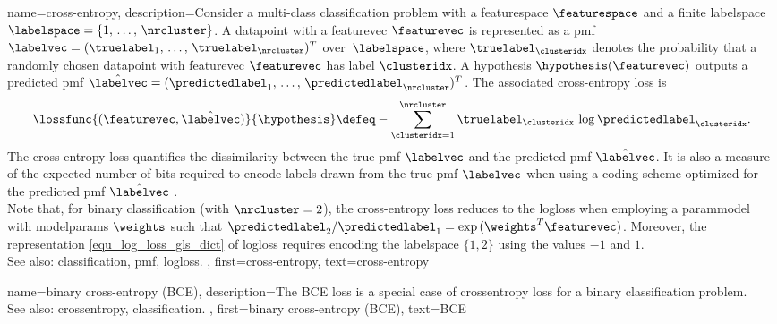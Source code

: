 {name={cross-entropy},
	description={Consider a multi-class \gls{classification} problem with a 
		\gls{featurespace} $\featurespace$ and a finite \gls{labelspace} 
              	$\labelspace = \{1,\,\ldots,\,\nrcluster\}$.  A \gls{datapoint} with a 
              	\gls{featurevec} $\featurevec$ is represented as a \gls{pmf} 
              	$\labelvec = (\truelabel_{1},\,\ldots,\,\truelabel_{\nrcluster})^{T}$ 
              	over~$\labelspace$, where $\truelabel_{\clusteridx}$ denotes the 
              	\gls{probability} that a randomly chosen \gls{datapoint} with 
		\gls{featurevec} $\featurevec$ has \gls{label} $\clusteridx$.  
		A \gls{hypothesis} $\hypothesis(\featurevec)$ outputs a predicted 
              	\gls{pmf} $\hat{\labelvec} = (\predictedlabel_{1},\,\ldots,
              	\,\predictedlabel_{\nrcluster})^{T}$. The associated 
              	cross-\gls{entropy} \gls{loss} is \cite{coverthomas} 
             	\begin{equation}
                		\nonumber
                		\lossfunc{(\featurevec,\hat{\labelvec})}{\hypothesis}
                		\defeq - \sum_{\clusteridx=1}^{\nrcluster} 
                		\truelabel_{\clusteridx}\,\log \predictedlabel_{\clusteridx}.
              	\end{equation}
		The cross-\gls{entropy} \gls{loss} quantifies the dissimilarity between the true 
		\gls{pmf} $\labelvec$ and the predicted \gls{pmf} $\hat{\labelvec}$. It is 
		also a \gls{measure} of the expected number of bits required to encode \glspl{label} 
		drawn from the true \gls{pmf} $\labelvec$ when using a coding scheme optimized for 
		the predicted \gls{pmf} $\hat{\labelvec}$ \cite{coverthomas}. \\
		Note that, for binary \gls{classification} (with $\nrcluster = 2$), the 
              	cross-\gls{entropy} \gls{loss} reduces to the \gls{logloss} when 
              	employing a \gls{parammodel} with \glspl{modelparam} $\weights$ 
              	such that $\predictedlabel_{2}/\predictedlabel_{1}
              	= \exp\,(\weights^{T}\featurevec)$. Moreover, the representation 
              	\eqref{equ_log_loss_gls_dict} of \gls{logloss} requires encoding 
              	the \gls{labelspace} $\{1,2\}$ using the values $-1$ and $1$. 
			  \\
		See also: \gls{classification}, \gls{pmf}, \gls{logloss}. }, 
 	first={cross-entropy},
 	text={cross-entropy}
}

{name={binary cross-entropy (BCE)},
	description={The BCE \gls{loss} is a 
   		special case of \gls{crossentropy} \gls{loss} for a binary \gls{classification} problem.
		\\
		See also: \gls{crossentropy}, \gls{classification}. }, 
 	first={binary cross-entropy (BCE)},
 	text={BCE}
}

